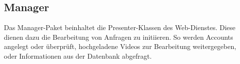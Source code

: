 \subsection{Manager} \label{service:modul:Manager}
Das Manager-Paket beinhaltet die Presenter-Klassen des Web-Dienstes. Diese dienen dazu die Bearbeitung von Anfragen zu initiieren. So werden Accounts angelegt oder überprüft, hochgeladene Videos zur Bearbeitung weitergegeben, oder Informationen aus der Datenbank abgefragt.
